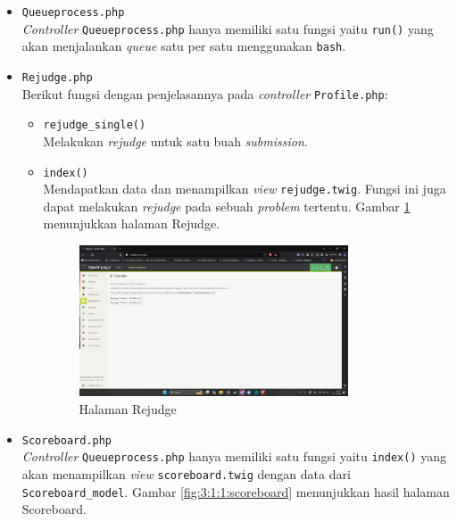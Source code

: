 \documentclass[a4paper,twoside]{article}
\begin{document}
\begin{enumerate}
\begin{itemize}
\begin{itemize}
			            \item \verb|Queueprocess.php| \\
			                  \textit{Controller} \verb|Queueprocess.php| hanya memiliki satu fungsi yaitu \verb|run()| yang akan menjalankan \textit{queue} satu per satu menggunakan \verb|bash|.

			            \item \verb|Rejudge.php| \\
			                  Berikut fungsi dengan penjelasannya pada \textit{controller} \verb|Profile.php|:

			                  \begin{itemize}
				                  \item \verb|rejudge_single()| \\
				                        Melakukan \textit{rejudge} untuk satu buah \textit{submission}.
				                  \item \verb|index()| \\
				                        Mendapatkan data dan menampilkan \textit{view} \verb|rejudge.twig|. Fungsi ini juga dapat melakukan \textit{rejudge} pada sebuah \textit{problem} tertentu. Gambar \ref{fig:3:1:1:rejudge} menunjukkan halaman Rejudge.

				                        \begin{figure}[H]
					                        \centering
					                        \includegraphics[width=0.8\textwidth]{views/rejudge.png}
					                        \caption{Halaman Rejudge}
					                        \label{fig:3:1:1:rejudge}
				                        \end{figure}

			                  \end{itemize}

			            \item \verb|Scoreboard.php| \\
			                  \textit{Controller} \verb|Queueprocess.php| hanya memiliki satu fungsi yaitu \verb|index()| yang akan menampilkan \textit{view} \verb|scoreboard.twig| dengan data dari \verb|Scoreboard_model|. Gambar \ref{fig:3:1:1:scoreboard} menunjukkan hasil halaman Scoreboard.


\end{itemize}
\end{itemize}
\end{enumerate}
\end{document}
